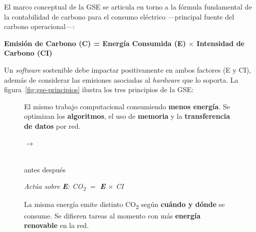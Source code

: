 El marco conceptual de la GSE se articula en torno a la fórmula fundamental de la contabilidad de carbono para el consumo eléctrico —principal fuente del carbono operacional—:


\textbf{Emisión de Carbono (C) = Energía Consumida (E) $\times$ Intensidad de Carbono (CI)}


Un \textit{software} sostenible debe impactar positivamente en ambos factores (E y CI), además de considerar las emisiones asociadas al \textit{hardware} que lo soporta. La figura~\ref{fig:gse-principios} ilustra los tres principios de la GSE:

\begin{figure}[htbp]
\centering
\begin{tcbraster}[
  raster columns=2,
  raster equal height,
  raster column skip=0.4cm,
  raster row skip=0.4cm,
  raster width=\textwidth,
  enhanced,
  fonttitle=\small\bfseries,
  coltitle=white,
  colbacktitle=green!45!black,
  colback=green!5,
  colframe=green!45!black,
  boxrule=0.7pt,
  top=6pt, bottom=6pt, left=8pt, right=8pt
]
\begin{tcolorbox}[title={Principio I -- Eficiencia energ\'etica}]
  \small
  El mismo trabajo computacional consumiendo \textbf{menos energ\'ia}.
  Se optimizan los \textbf{algoritmos}, el uso de \textbf{memoria}
  y la \textbf{transferencia de datos} por red.
  \vspace{6pt}\par
  \centering
  \colorbox{red!30}{\rule{0pt}{18pt}\hspace{16pt}}%
  \quad$\rightarrow$\quad
  \colorbox{green!40}{\rule{0pt}{9pt}\hspace{16pt}}\\[2pt]
  \tiny antes \hspace{32pt} despu\'es
  \par\vspace{4pt}\raggedright
  \footnotesize\textit{Act\'ua sobre \textbf{E}: CO\textsubscript{2} $=$ \textbf{E} $\times$ CI}
\end{tcolorbox}
\begin{tcolorbox}[
  title={Principio II -- \textit{Carbon-Aware Computing}},
  colbacktitle=practica4!80!black,
  colframe=practica4!70!black,
  colback=practica4!5
]
  \small
  La misma energ\'ia emite distinto CO\textsubscript{2} seg\'un
  \textbf{cu\'ando y d\'onde} se consume.
  Se difieren tareas al momento con m\'as \textbf{energ\'ia renovable} en la red.
  \vspace{6pt}\par

\end{tcolorbox}
\end{tcbraster}
\end{figure}
